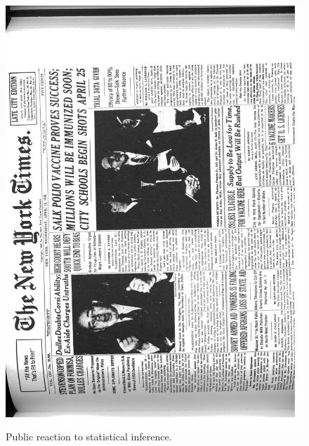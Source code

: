\begin{figure}
\caption{Public reaction to statistical inference.}
\label{f_nytimes}
\vspace*{4ex}
\includegraphics[width=150mm]{salk_nytimes}
\end{figure}
